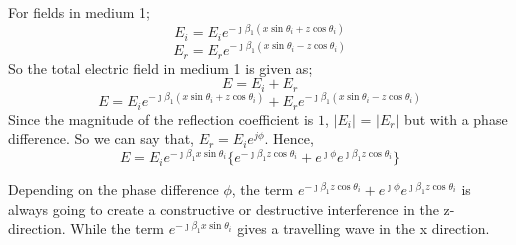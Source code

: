 For fields in medium 1;
\begin{equation}
E_i = E_i e^{- \jmath \beta_1(x\sin\theta_i + z\cos\theta_i)}
\end{equation}
\begin{equation}
E_r = E_r e^{- \jmath \beta_1(x\sin\theta_i - z\cos\theta_i)}
\end{equation}
So the total electric field in medium 1 is given as;
\begin{equation*}
E = E_i + E_r
\end{equation*}
\begin{equation*}
E =  E_i e^{- \jmath \beta_1(x\sin\theta_i + z\cos\theta_i)} + E_r e^{- \jmath \beta_1(x\sin\theta_i - z\cos\theta_i)}
\end{equation*}
Since the magnitude of the reflection coefficient is $1$,  $|E_{i}|$ = $|E_{r}|$ but with a phase difference. So we can say that, $E_{r} = E_{i}e^{j\phi}$.
Hence,
\begin{equation*}
E = E_i e^{- \jmath \beta_1x\sin\theta_i}\{ e^{- \jmath \beta_1z\cos\theta_i} + e^{\jmath \phi}
e^{\jmath \beta_1 z\cos\theta_i} \}
\end{equation*}

Depending on the phase difference $\phi$, the term $e^{- \jmath \beta_1z\cos\theta_i} + e^{\jmath \phi}
e^{\jmath \beta_1 z\cos\theta_i}$ is always going to create a constructive or destructive interference in the z-direction. While the term $ e^{- \jmath \beta_1x\sin\theta_i}$ gives a travelling wave in the x direction.

